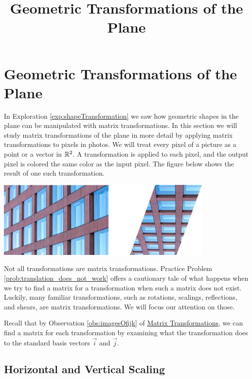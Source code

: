 \documentclass{ximera}
\title{Geometric Transformations of the Plane} \license{CC BY-NC-SA 4.0}
\begin{document}
\begin{abstract}
 \end{abstract}
\maketitle

\section*{Geometric Transformations of the Plane}
In Exploration \ref{exp:shapeTransformation} we saw how geometric shapes in the plane can be manipulated with matrix transformations.  In this section we will study matrix transformations of the plane in more detail by applying matrix transformations to pixels in photos.  
We will treat every pixel of a picture as a point or a vector in $\mathbb{R}^2$.  A transformation is applied to each pixel, and the output pixel is colored the same color as the input pixel.  The figure below shows the result of one such transformation.

\begin{image}
         \includegraphics[height=1.5in]{twobuildings.jpg}
\end{image}

Not all transformations are matrix transformations.  Practice Problem \ref{prob:translation_does_not_work} offers a cautionary tale of what happens when we try to find a matrix for a transformation when such a matrix does not exist.
Luckily, many familiar transformations, such as rotations, scalings, reflections, and shears, are matrix transformations. We will focus our attention on those.

Recall that by Observation \ref{obs:imagesOfijk} of \href{https://ximera.osu.edu/oerlinalg/LinearAlgebra/LTR-0005/main}{Matrix Transformations}, we can find a matrix for each transformation by examining what the transformation does to the standard basis vectors $\vec{i}$ and $\vec{j}$. 

\subsection*{Horizontal and Vertical Scaling} 
\end{document}
